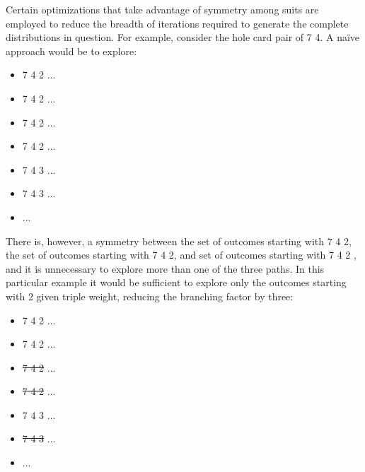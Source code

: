 Certain optimizations that take advantage of symmetry among suits are employed to reduce the breadth of iterations required to generate the complete distributions in question.
For example, consider the hole card pair of 7\xs{} 4\xs{}.
A na\"{i}ve approach would be to explore:
\begin{itemize}
\singlespacing
\item 7\xs{} 4\xs{} 2\xs{} ...
\item 7\xs{} 4\xs{} 2\xh{} ...
\item 7\xs{} 4\xs{} 2\xc{} ...
\item 7\xs{} 4\xs{} 2\xd{} ...
\item 7\xs{} 4\xs{} 3\xs{} ...
\item 7\xs{} 4\xs{} 3\xh{} ...
\item ...
\end{itemize}
There is, however, a symmetry between the set of outcomes starting with 7\xs{} 4\xs{} 2\xh{}, the set of outcomes starting with 7\xs{} 4\xs{} 2\xc{}, and set of outcomes starting with 7\xs{} 4\xs{} 2\xd{}
, and it is unnecessary to explore more than one of the three paths.
In this particular example it would be sufficient to explore only the outcomes starting with 2\xh{} given triple weight, reducing the branching factor by three:
\begin{itemize}
\singlespacing
\item 7\xs{} 4\xs{} 2\xs{} ...
\item 7\xs{} 4\xs{} 2\xh{} ...
\item \sout{7\xs{} 4\xs{} 2\xc{}} ...
\item \sout{7\xs{} 4\xs{} 2\xd{}} ...
\item 7\xs{} 4\xs{} 3\xs{} ...
\item \sout{7\xs{} 4\xs{} 3\xh{}} ...
\item ...
\end{itemize}



